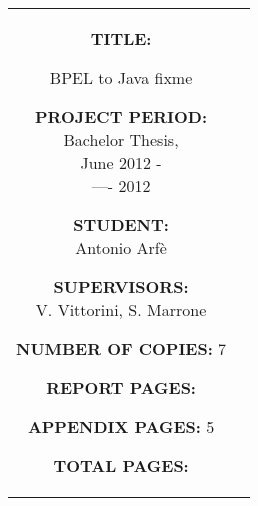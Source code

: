\documentclass[a4paper,11pt]{article}
\begin{document}
\begin{titlepage}
\begin{nopagebreak}
{\begin{tabular}{cc}
{\begin{description}
\item {\bf TITLE:}

BPEL to Java fixme

\end{description}

\parbox{8cm}{

\begin{description}
         \item {\bf PROJECT PERIOD:}\\
           Bachelor Thesis, \\
            June 2012 -\\---- 2012\\
           \hspace{4cm}
         \item {\bf STUDENT:}\\
           Antonio Arfè\\
           \hspace{2cm}
         \item {\bf SUPERVISORS:}\\
           V. Vittorini, S. Marrone
\end{description}
}

\begin{description}
        \item {\bf NUMBER OF COPIES:} 7
        \item {\bf REPORT PAGES:} \pageref{report_end}
        \item {\bf APPENDIX PAGES:} 5
        \item {\bf TOTAL PAGES:} \pageref{LastPage}
\end{description}
\vfill } &
\parbox{7cm}{
  \vspace{.15cm}
  \flushright
}
\end{tabular}
}


\end{nopagebreak}
\end{titlepage}
\end{document}
